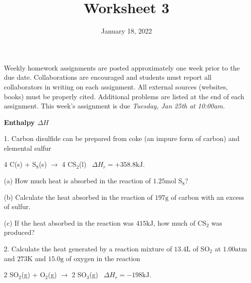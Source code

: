 \documentclass[11pt]{article}
\title{\textbf{Worksheet 3}}
\date{\vspace{-2em}January 18, 2022}
\begin{document}
\maketitle

Weekly homework assignments are posted approximately one week prior to the
due date. Collaborations are encouraged and students must report all collaborators
in writing on each assignment. All external sources (websites, books) must be
properly cited. Additional problems are listed at the end of each assignment.
This week's assignment is due \textit{Tuesday, Jan 25th at 10:00am.}

\textbf{Enthalpy $\Delta H$}

1. Carbon disulfide can be prepared from coke (an impure form of carbon) and
elemental sulfur

\begin{center}
  4 C(s) + S$_8$(s) $\rightarrow$ 4 CS$_2$(l) \, $\Delta H_r = +358.8\text{kJ}$.
\end{center}

(a) How much heat is absorbed in the reaction of $1.25\text{mol}$ S$_8$?

(b) Calculate the heat absorbed in the reaction of $197\text{g}$ of carbon
with an excess of sulfur.

(c) If the heat absorbed in the reaction was $415\text{kJ}$, how much of CS$_2$
was produced?

\vspace{2.5in}

2. Calculate the heat generated by a reaction mixture of $13.4\text{L}$ of SO$_2$
at $1.00\text{atm}$ and $273\text{K}$ and $15.0\text{g}$ of oxygen in the reaction

\begin{center}
  2 SO$_2$(g) + O$_2$(g) $\rightarrow$ 2 SO$_3$(g) \, $\Delta H_r = -198\text{kJ}$.
\end{center}
\end{document}
